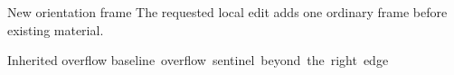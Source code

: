 \documentclass[11pt,aspectratio=169]{beamer}
\begin{document}
\begin{frame}{New orientation frame}
  The requested local edit adds one ordinary frame before existing material.
\end{frame}
\begin{frame}{Inherited overflow}
  \noindent\hspace{0.8\textwidth}%
  \mbox{baseline overflow sentinel beyond the right edge}
\end{frame}
\end{document}
